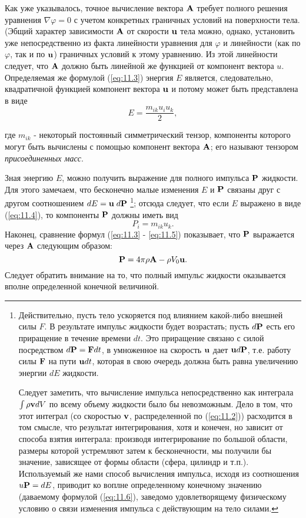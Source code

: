 Как уже указывалось, точное вычисление вектора $\mathbf{A}$ требует полного решения
уравнения $\nabla \varphi = 0$ с учетом конкретных граничных условий на
поверхности тела. (Эбщий характер зависимости $\mathbf{A}$ от скорости $\mathbf{u}$
тела можно, однако, установить уже непосредственно из факта линейности уравнения
для $\varphi$ и линейности (как по $\varphi$, так и по $\mathbf{u}$) граничных
условий к этому уравнению. Из этой линейности следует, что $\mathbf{A}$ должно быть
линейной же функцией от компонент вектора $u$. Определяемая же формулой (\ref{eq:11.3})
энергия $E$ является, следовательно, квадратичной функцией компонент вектора
$\mathbf{u}$ и потому может быть представлена в виде
\begin{equation}
   \label{eq:11.4}
       E = \frac{m_{ik}u_i u_k}{2},
\end{equation}


где $m_{ik}$ - некоторый постоянный симметрический тензор, компоненты которого
могут быть вычислены с помощью компонент вектора $\mathbf{A}$; его называют
тензором \textit{присоединенных масс}.

Зная энергию $E$, можно получить выражение для полного импульса $\mathbf{P}$
жидкости. Для этого замечаем, что бесконечно малые изменения $E$ и $\mathbf{P}$
связаны друг с другом соотношением $dE = \mathbf{u}\; d\mathbf{P}$
\footnote{
Действительно, пусть тело ускоряется под влиянием какой-либо внешней силы $F$.
В результате импульс жидкости будет возрастать; пусть $d\mathbf{P}$ есть его приращение
в течение времени $dt$. Это приращение связано с силой посредством $d\mathbf{P} = \mathbf{F}dt$,
в умноженное на скорость $\mathbf{u}$ дает $\mathbf{u} d \mathbf{P}$, т.е. работу силы $\mathbf{F}$ на
пути $\mathbf{u} dt$, которая в свою очередь должна быть равна увеличению энергии $dE$ жидкости.

Следует заметить, что вычисление импульса непосредственно как интеграла $\int \rho \mathbf{v} dV$
по всему объему жидкости было бы невозможным. Дело в том, что этот интеграл (со скоростью $\mathbf{v}$, распределенной по (\ref{eq:11.2})) расходится в том смысле, что результат интегрирования, хотя и конечен, но зависит от способа взятия интеграла: производя
интегрирование по большой области, размеры которой устремляют затем к бесконечности, мы
получили бы значение, зависящее от формы области (сфера, цилиндр и т.п.). Используемый же
нами способ вычисления импульса, исходя из соотношения $u \mathbf{P} = dE$, приводит ко
воплне определенному конечному значению (даваемому формулой (\ref{eq:11.6}),
заведомо удовлетворящему физическому условию о связи изменения импульса с действующим на тело
силами.
}; отсюда следует,
что если $E$ выражено в виде (\ref{eq:11.4}), то компоненты $\mathbf{P}$ должны иметь вид
\begin{equation}
   \label{eq:11.5}
       P_i = m_{ik} u_k .
\end{equation}
Наконец, сравнение формул (\ref{eq:11.3} - \ref{eq:11.5}) показывает, что $\mathbf{P}$ выражается
через $\mathbf{A}$ следующим образом:
\begin{equation}
   \label{eq:11.6}
   \mathbf{P} = 4\pi \rho \mathbf{A} - \rho V_0 \mathbf{u}.
\end{equation}
Следует обратить внимание на то, что полный импульс жидкости оказывается вполне
определенной конечной величиной.

